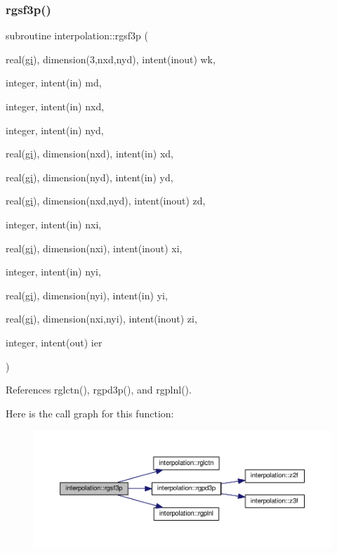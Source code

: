 \subsubsection{\texorpdfstring{rgsf3p()}{rgsf3p()}}
{\footnotesize\ttfamily subroutine interpolation\+::rgsf3p (\begin{DoxyParamCaption}\item[{real(\mbox{\hyperlink{namespaceinterpolation_a7242dea48715e8170bae81efe12c64be}{gi}}), dimension(3,nxd,nyd), intent(inout)}]{wk,  }\item[{integer, intent(in)}]{md,  }\item[{integer, intent(in)}]{nxd,  }\item[{integer, intent(in)}]{nyd,  }\item[{real(\mbox{\hyperlink{namespaceinterpolation_a7242dea48715e8170bae81efe12c64be}{gi}}), dimension(nxd), intent(in)}]{xd,  }\item[{real(\mbox{\hyperlink{namespaceinterpolation_a7242dea48715e8170bae81efe12c64be}{gi}}), dimension(nyd), intent(in)}]{yd,  }\item[{real(\mbox{\hyperlink{namespaceinterpolation_a7242dea48715e8170bae81efe12c64be}{gi}}), dimension(nxd,nyd), intent(inout)}]{zd,  }\item[{integer, intent(in)}]{nxi,  }\item[{real(\mbox{\hyperlink{namespaceinterpolation_a7242dea48715e8170bae81efe12c64be}{gi}}), dimension(nxi), intent(inout)}]{xi,  }\item[{integer, intent(in)}]{nyi,  }\item[{real(\mbox{\hyperlink{namespaceinterpolation_a7242dea48715e8170bae81efe12c64be}{gi}}), dimension(nyi), intent(in)}]{yi,  }\item[{real(\mbox{\hyperlink{namespaceinterpolation_a7242dea48715e8170bae81efe12c64be}{gi}}), dimension(nxi,nyi), intent(inout)}]{zi,  }\item[{integer, intent(out)}]{ier }\end{DoxyParamCaption})}



References rglctn(), rgpd3p(), and rgplnl().

Here is the call graph for this function\+:
\nopagebreak
\begin{figure}[H]
\begin{center}
\leavevmode
\includegraphics[width=350pt]{namespaceinterpolation_a1e2786e4f0a0a9dd065f757b66de84fd_cgraph}
\end{center}
\end{figure}
\mbox{\label{namespaceinterpolation_a5701eba38ba9b96476493a39580ebe38}} 
